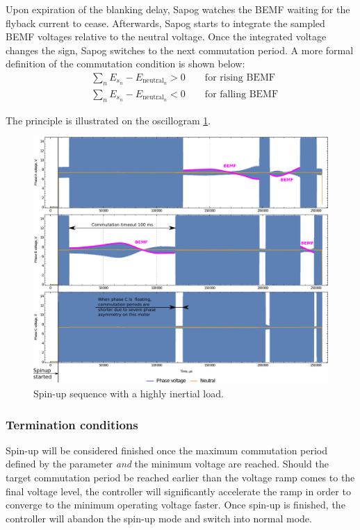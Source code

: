 \documentclass{zubaxdoc}
\begin{document}
Upon expiration of the blanking delay, Sapog watches the BEMF waiting for the flyback current to cease.
Afterwards, Sapog starts to integrate the sampled BEMF voltages relative to the neutral voltage.
Once the integrated voltage changes the sign, Sapog switches to the next commutation period.
A more formal definition of the commutation condition is shown below:
\begin{equation}
\begin{aligned}
&\sum_{n} E_{s_n} - E_{\text{neutral}_n} > 0 \qquad\text{for rising BEMF}\\
&\sum_{n} E_{s_n} - E_{\text{neutral}_n} < 0 \qquad\text{for falling BEMF}
\end{aligned}
\end{equation}

The principle is illustrated on the oscillogram \ref{spinup_phase_voltages}.

\begin{figure}[hbt]
    \centering
	\includegraphics[width=\textwidth]{spinup_phase_voltages}
	\caption{Spin-up sequence with a highly inertial load.
	\label{spinup_phase_voltages}}
\end{figure}

\subsubsection{Termination conditions}

Spin-up will be considered finished once the maximum commutation period defined by the parameter
 \emph{and} the minimum voltage  are reached.
Should the target commutation period be reached earlier than the voltage ramp comes to the final
voltage level, the controller will significantly accelerate the ramp in order to converge to
the minimum operating voltage faster.
Once spin-up is finished, the controller will abandon the spin-up mode and switch into normal mode.
\end{document}
